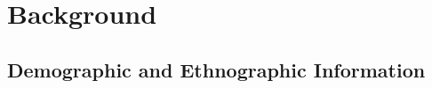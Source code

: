 \documentclass[grammar]{subfiles}
\begin{document}
  \chapter{Background}
  \label{ch:background}

  \section{Demographic and Ethnographic Information}

  \ToBeWritten
\end{document}
